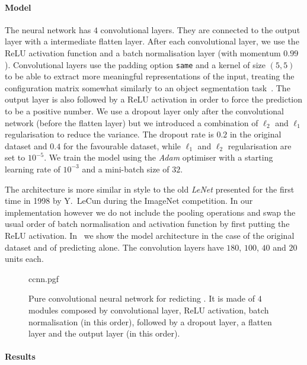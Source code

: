 \paragraph{Model}

The neural network has $4$ convolutional layers.
They are connected to the output layer with a intermediate flatten layer.
After each convolutional layer, we use the ReLU activation function and a batch normalisation layer (with momentum $0.99$).
Convolutional layers use the padding option \texttt{same} and a kernel of size $(5, 5)$ to be able to extract more meaningful representations of the input, treating the configuration matrix somewhat similarly to an object segmentation task~\cite{Peng:2017:LargeKernelMattersa}.
The output layer is also followed by a ReLU activation in order to force the prediction to be a positive number.
We use a dropout layer only after the convolutional network (before the flatten layer) but we introduced a combination of $\ell_2$ and $\ell_1$ regularisation to reduce the variance.
The dropout rate is $0.2$ in the original dataset and $0.4$ for the favourable dataset, while $\ell_1$ and $\ell_2$ regularisation are set to $10^{-5}$.
We train the model using the \emph{Adam} optimiser with a starting learning rate of $10^{-3}$ and a mini-batch size of $32$.

The architecture is more similar in style to the old \emph{LeNet} presented for the first time in 1998 by Y.\ LeCun during the ImageNet competition.
In our implementation however we do not include the pooling operations and swap the usual order of batch normalisation and activation function by first putting the ReLU activation.
In~ we show the model architecture in the case of the original dataset and of predicting  alone.
The convolution layers have $180$, $100$, $40$ and $20$ units each.

\begin{figure}[tbp]
  \centering
  {ccnn.pgf}
  \caption{%
    Pure convolutional neural network for redicting .
    It is made of $4$ modules composed by convolutional layer, ReLU activation, batch normalisation (in this order), followed by a dropout layer, a flatten layer and the output layer (in this order).
  }
  \label{fig:nn:lenet}
\end{figure}


\paragraph{Results}

